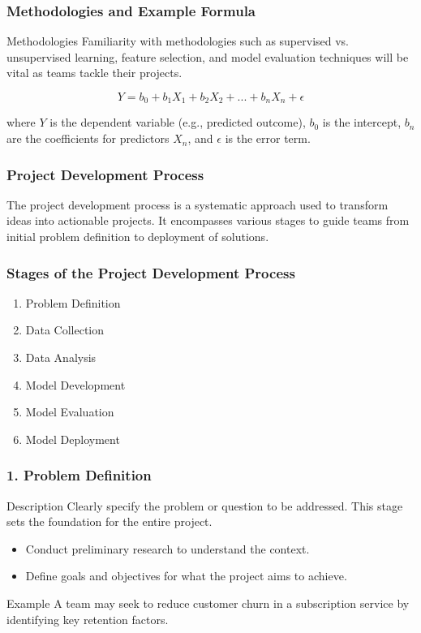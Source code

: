 \documentclass[aspectratio=169]{beamer}
\begin{document}
\begin{frame}[fragile]
    \frametitle{Methodologies and Example Formula}
    \begin{block}{Methodologies}
        Familiarity with methodologies such as supervised vs. unsupervised learning, feature selection, and model evaluation techniques will be vital as teams tackle their projects.
    \end{block}
    
    \begin{equation}
        Y = b_0 + b_1X_1 + b_2X_2 + ... + b_nX_n + \epsilon
    \end{equation}
    
    where \(Y\) is the dependent variable (e.g., predicted outcome), \(b_0\) is the intercept, \(b_n\) are the coefficients for predictors \(X_n\), and \(\epsilon\) is the error term.
\end{frame}

\begin{frame}
    \frametitle{Project Development Process}
    The project development process is a systematic approach used to transform ideas into actionable projects. It encompasses various stages to guide teams from initial problem definition to deployment of solutions.
\end{frame}

\begin{frame}
    \frametitle{Stages of the Project Development Process}
    \begin{enumerate}
        \item Problem Definition
        \item Data Collection
        \item Data Analysis
        \item Model Development
        \item Model Evaluation
        \item Model Deployment
    \end{enumerate}
\end{frame}

\begin{frame}[fragile]
    \frametitle{1. Problem Definition}
    \begin{block}{Description}
        Clearly specify the problem or question to be addressed. This stage sets the foundation for the entire project.
    \end{block}
    \begin{itemize}
        \item Conduct preliminary research to understand the context.
        \item Define goals and objectives for what the project aims to achieve.
    \end{itemize}
    \begin{block}{Example}
        A team may seek to reduce customer churn in a subscription service by identifying key retention factors.
    \end{block}
\end{frame}
\end{document}
